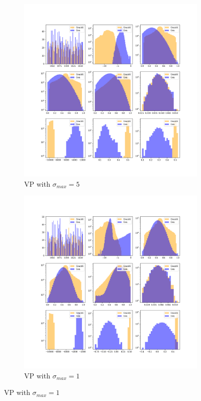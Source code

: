 \begin{figure}[htbp]
    \vspace{0.4em} %
    
    \begin{subfigure}[b]{0.4\textwidth}
        \includegraphics[width=\textwidth]{Figures/vp_5.png}
        \caption{VP with $\sigma_{max} = 5$}
        \label{fig:vp_5}
    \end{subfigure}
    \hspace{0.015\textwidth} %
    \begin{subfigure}[b]{0.4\textwidth}
        \includegraphics[width=\textwidth]{Figures/vp_1.png}
        \caption{VP with $\sigma_{max} = 1$}
        \label{fig:vp_1}
    \end{subfigure}
    

\end{figure}
